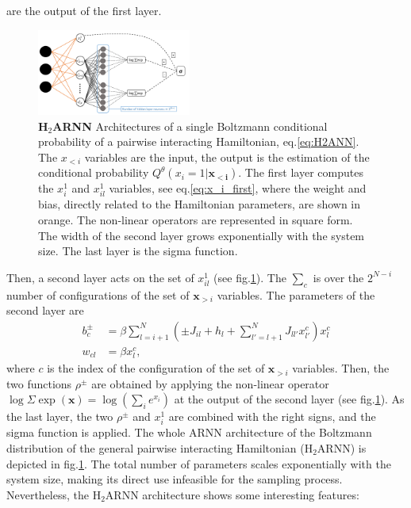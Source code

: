 \documentclass[aps,physrev,10pt,floatfix,reprint]{revtex4-2}
\begin{document}
 are the output of the first layer. 
 \begin{figure}[!ht]
    \includegraphics[width=0.45\textwidth]{img/h2ARNN.pdf}
    \caption{ \textbf{H$_2$ARNN} Architectures of a single Boltzmann conditional probability of a pairwise interacting Hamiltonian, eq.\ref{eq:H2ANN}. The $x_{<i}$ variables are the input, the output is the estimation of the conditional probability $Q^{\theta} (x_i=1 | \mathbf{x_{<i}})$. The first layer computes the $x^1_i$ and $x^1_{il}$ variables, see eq.\ref{eq:x_i_first}, where the weight and bias, directly related to the Hamiltonian parameters, are shown in orange. The non-linear operators are represented in square form. The width of the second layer grows exponentially with the system size. The last layer is the sigma function.}
    \label{fig:arch}
\end{figure}
Then, a second layer acts on the set of $x_{il}^1$ (see fig.\ref{fig:arch}). The $\sum_{c}$ is over the $2^{N-i}$ number of configurations of the set of $\mathbf{x}_{>i}$ variables. 
The parameters of the second layer are
\begin{align}
    b_c^{\pm} &= \beta\sum_{l=i+1}^N (\pm J_{il} + h_l + \sum_{l'=l+1}^N J_{ll'}x^c_{l'}) x^c_l \\
    w_{cl} &=\beta x^c_l,
\end{align}
 where $c$ is the index of the configuration of the set of $\mathbf{x}_{>i}$ variables. Then, the two functions $\rho^{\pm}$ are obtained by applying the non-linear operator $\log \Sigma \exp (\mathbf{x}) = \log(\sum_i e^{x_i})$ at the output of the second layer (see fig.\ref{fig:arch}). 
As the last layer, the two $\rho^{\pm}$ and $x_i^1$ are combined with the right signs, and the sigma function is applied. The whole ARNN architecture of the Boltzmann distribution of the general pairwise interacting Hamiltonian ($\text{H}_2\text{ARNN}$) is depicted in fig.\ref{fig:arch}. The total number of parameters scales exponentially with the system size, making its direct use infeasible for the sampling process.
Nevertheless, the $\text{H}_2\text{ARNN}$ architecture shows some interesting features:
\end{document}

